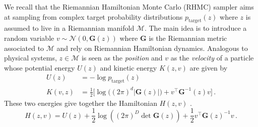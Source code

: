 \documentclass[10pt,journal,compsoc]{IEEEtran}
\begin{document}
We recall that the Riemannian Hamiltonian Monte Carlo (RHMC) sampler aims at sampling from complex target probability distributions $p_{\mathrm{target}}(z)$ where $z$ is assumed to live in a Riemannian manifold $\mathcal{M}$. The main idea is to introduce a random variable $v \sim \mathcal{N}(0, \mathbf{G}(z))$ where $\mathbf{G}$ is the Riemannian metric associated to $\mathcal{M}$ and rely on Riemannian Hamiltonian dynamics. Analogous to physical systems, $z\in \mathcal{M}$ is seen as the \emph{position} and $v$ as the \emph{velocity} of a particle whose potential energy $U(z)$ and kinetic energy $K(z, v)$ are given by 
    \begin{equation*}
    \begin{aligned}
         U(z) &= - \log p_{\mathrm{target}}(z)\\
         K(v, z)&= \frac{1}{2}\Big[\log\big( (2\pi)^d|\mathbf{G}(z)|\big )+ v^{\top} \textbf{G}^{-1}(z)v \Big ]\,.
    \end{aligned}
    \end{equation*}
     These two energies give together the Hamiltonian $H(z, v)$ \cite{duane_hybrid_1987,leimkuhler_simulating_2004}. 
    \begin{equation}
        \label{eq: app riemannian hamiltonian}
        H(z, v) = U(z) + \frac{1}{2} \log((2 \pi)^D \det \mathbf{G}(z)) + \frac{1}{2} v^{\top} \mathbf{G}(z)^{-1} v\,.
    \end{equation}
     
\end{document}
